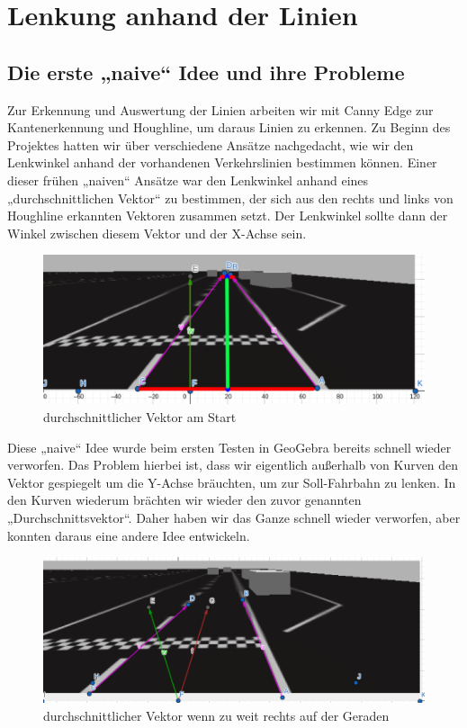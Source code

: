 \section{Lenkung anhand der Linien} %
\subsection{Die erste „naive“ Idee und ihre Probleme}
Zur Erkennung und Auswertung der Linien arbeiten wir mit Canny Edge zur Kantenerkennung und Houghline, um daraus Linien zu erkennen. Zu Beginn des Projektes hatten wir über verschiedene Ansätze nachgedacht, wie wir den Lenkwinkel anhand der vorhandenen Verkehrslinien bestimmen können. Einer dieser frühen „naiven“ Ansätze war den Lenkwinkel anhand eines „durchschnittlichen Vektor“ zu bestimmen, der sich aus den rechts und links von Houghline erkannten Vektoren zusammen setzt. Der Lenkwinkel sollte dann der Winkel zwischen diesem Vektor und der X-Achse sein. 
\begin{figure}[H]
	\centering	
	\includegraphics[width=.5\textwidth]{img/vector_gerade}
	\caption[durchschnittlichen Vektor am Start]{durchschnittlicher Vektor am Start}
	\label{fig:vector_gerade}
\end{figure}

Diese „naive“ Idee wurde beim ersten Testen in GeoGebra bereits schnell wieder verworfen. Das Problem hierbei ist, dass wir eigentlich außerhalb von Kurven  den Vektor gespiegelt um die Y-Achse bräuchten, um zur Soll-Fahrbahn zu lenken. In den Kurven wiederum brächten wir wieder den zuvor genannten „Durchschnittsvektor“. Daher haben wir das Ganze schnell wieder verworfen, aber konnten daraus eine andere Idee entwickeln.

\begin{figure}[H]
	\centering	
	\includegraphics[width=.5\textwidth]{img/vector_zu_rechts}
	\caption[durchschnittlichen Vektor wenn zu weit rechts auf der Geraden]{durchschnittlicher Vektor wenn zu weit rechts auf der Geraden}
	\label{fig:vector_zu_rechts}
\end{figure}

